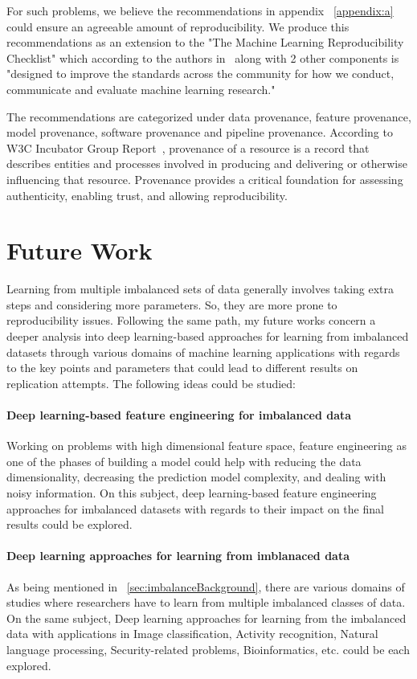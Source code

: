 For such problems, we believe the recommendations in appendix ~\ref{appendix:a} could ensure 
an agreeable amount of reproducibility. We produce this recommendations as an extension to 
the "The Machine Learning Reproducibility Checklist" which according to the authors 
in~\cite{pineau_improving_2020} along with 2 other components is "designed to improve the 
standards across the community for how we conduct, communicate and evaluate machine 
learning research."

The recommendations are categorized under data provenance, feature provenance, model provenance, 
software provenance and pipeline provenance. According to W3C Incubator Group Report~\cite{w3c}, 
provenance of a resource is a record that describes entities and processes involved in producing 
and delivering or otherwise influencing that resource. Provenance provides a critical foundation 
for assessing authenticity, enabling trust, and allowing reproducibility. 

\section{Future Work}
Learning from multiple imbalanced sets of data generally involves taking extra steps and considering 
more parameters. So, they are more prone to reproducibility issues. Following the same path, my future 
works concern a deeper analysis into deep learning-based approaches for learning from imbalanced datasets 
through various domains of machine learning applications with regards to the key points 
and parameters that could lead to different results on replication attempts. The following ideas 
could be studied:
\paragraph{Deep learning-based feature engineering for imbalanced data}
Working on problems with high dimensional feature space, feature engineering as one 
of the phases of building a model could help with reducing the data dimensionality, 
decreasing the prediction model complexity, and dealing with noisy information. On this subject, 
deep learning-based feature engineering approaches for imbalanced datasets with regards to their 
impact on the final results could be explored.
\paragraph{Deep learning approaches for learning from imblanaced data}
As being mentioned in ~\ref{sec:imbalanceBackground}, there are various domains of studies 
where researchers have to learn from multiple imbalanced classes of data. On the same subject, 
Deep learning approaches for learning from the imbalanced data with applications in 
Image classification, Activity recognition, Natural language processing, 
Security-related problems, Bioinformatics, etc. could be each explored.